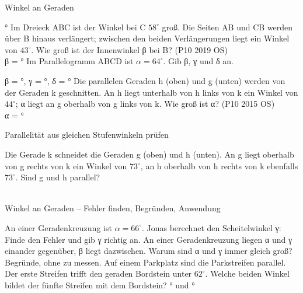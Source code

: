 \begin{aufgabe}{Winkel an Geraden}
\begin{teile}
\leerfeld °
\teil Im Dreieck ABC ist der Winkel bei C $58^\circ$ groß. Die Seiten AB und CB werden über B hinaus verlängert; zwischen den beiden Verlängerungen liegt ein Winkel von $43^\circ$. Wie groß ist der Innenwinkel β bei B? \hfill (P10 2019 OS) \\ β = \leerfeld °
\teil Im Parallelogramm ABCD ist $\alpha = 64^\circ$. Gib β, γ und δ an.

β = \leerfeld °, γ = \leerfeld °, δ = \leerfeld °
\teil Die parallelen Geraden h (oben) und g (unten) werden von der Geraden k geschnitten. An h liegt unterhalb von h links von k ein Winkel von $44^\circ$; α liegt an g oberhalb von g links von k. Wie groß ist α? \hfill (P10 2015 OS) \\

α = \leerfeld °
\end{teile}
\end{aufgabe}

\begin{aufgabe}{Parallelität aus gleichen Stufenwinkeln prüfen}
\begin{teile}
\teil Die Gerade k schneidet die Geraden g (oben) und h (unten). An g liegt oberhalb von g rechts von k ein Winkel von $73^\circ$, an h oberhalb von h rechts von k ebenfalls $73^\circ$. Sind g und h parallel? \\  \\ 
\end{teile}
\end{aufgabe}

\begin{aufgabe}{Winkel an Geraden – Fehler finden, Begründen, Anwendung}
\begin{teile}
\teil An einer Geradenkreuzung ist $\alpha = 66^\circ$. Jonas berechnet den Scheitelwinkel γ:  Finde den Fehler und gib γ richtig an.
\teil An einer Geradenkreuzung liegen α und γ einander gegenüber, β liegt dazwischen. Warum sind α und γ immer gleich groß? Begründe, ohne zu messen.
\teil Auf einem Parkplatz sind die Parkstreifen parallel. Der erste Streifen trifft den geraden Bordstein unter $62^\circ$. Welche beiden Winkel bildet der fünfte Streifen mit dem Bordstein? \leerfeld ° und \leerfeld °
\end{teile}
\end{aufgabe}
